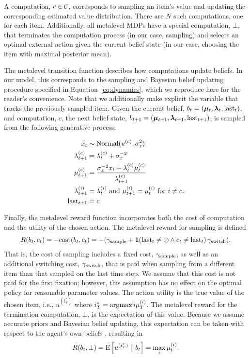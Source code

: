 A computation, $c \in \mathcal{C}$, corresponds to sampling an item's value and updating the corresponding estimated value distribution. There are $N$ such computations, one for each item. Additionally, all metalevel MDPs have a special computation, $\bot$, that terminates the computation process (in our case, sampling) and selects an optimal external action given the current belief state (in our case, choosing the item with maximal posterior mean).

The metalevel transition function describes how computations update beliefs. In our model, this corresponds to the sampling and Bayesian belief updating procedure specified in Equation~\ref{eq:dynamics}, which we reproduce here for the reader's convenience. Note that we additionally make explicit the variable that tracks the previously sampled item. Given the current belief, $b_t = (\boldsymbol{\mu}_t, \boldsymbol{\lambda}_t, \mathrm{last}_t)$, and computation, $c$, the next belief state, $b_{t+1} = (\boldsymbol{\mu}_{t+1}, \boldsymbol{\lambda}_{t+1}, \mathrm{last}_{t+1})$, is sampled from the following generative process:

\begin{equation}\label{eq:dynamics2}
  \begin{aligned}
  x_{t} &\sim \mathrm{Normal}(u^{(c)},\sigma_{x}^{2})\\
  \lambda_{t+1}^{(c)} & =\lambda_{t}^{(c)}+\sigma_{x}^{-2}\\
  \mu_{t+1}^{(c)} & =\frac{\sigma_{x}^{-2}x_{t}+\lambda_{t}^{(c)}\mu_{t}^{(c)}}{\lambda_{t+1}^{(c)}}\\
  \lambda_{t+1}^{(i)} & =\lambda_{t}^{(i)} 
    \text{ and } \mu_{t+1}^{(i)} =\mu_{t}^{(i)} \text{ for }i\neq c.\\
  \mathrm{last}_{t+1} &= c\\
      \end{aligned}
\end{equation}

Finally, the metalevel reward function incorporates both the cost of computation and the utility of the chosen action. The metalevel reward for sampling is defined
$$
R(b_t, c_t) = -\text{cost}(b_t, c_t) = -(\gamma_\text{sample} + \mathbf{1}(\mathrm{last}_t \neq \oslash \wedge c_t \neq \mathrm{last}_t)\,\gamma_\text{switch}).
$$
That is, the cost of sampling includes a fixed cost, $\gamma_\text{sample}$, as well as an additional switching cost, $\gamma_\text{switch}$, that is paid when sampling from a different item than that sampled on the last time step. We assume that this cost is not paid for the first fixation; however, this assumption has no effect on the optimal policy for reasonable parameter values.
The action utility is the true value of the chosen item, i.e., $u^{(i^*_T)}$ where $i^*_T = \operatorname*{argmax}{i} \mu_T^{(i)}$. The metalevel reward for the termination computation, $\bot$, is the expectation of this value. Because we assume accurate priors and Bayesian belief updating, this expectation can be taken with respect to the agent's own beliefs \citep{hay2012selecting}, resulting in 
$$
R(b_t, \bot) = \E \left[ u^{(i^*_T)} \ \big\vert\ b_t \right]
= \max_i \mu_t^{(i)}.
$$
